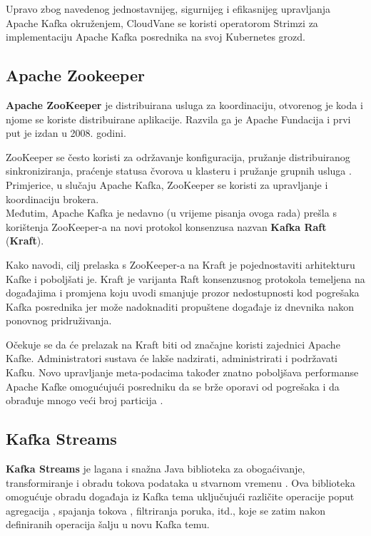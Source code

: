 \documentclass[times, utf8, diplomski]{fer}
\begin{document}
Upravo zbog navedenog jednostavnijeg, sigurnijeg i efikasnijeg upravljanja Apache Kafka okruženjem, CloudVane se koristi operatorom Strimzi za implementaciju Apache Kafka posrednika na svoj Kubernetes grozd.

\subsection{Apache Zookeeper}

\textbf{Apache ZooKeeper} je distribuirana usluga za koordinaciju, otvorenog je koda i njome se koriste distribuirane aplikacije. Razvila ga je Apache Fundacija i prvi put je izdan u 2008. godini.

ZooKeeper se često koristi za održavanje konfiguracija, pružanje distribuiranog sinkroniziranja, praćenje statusa čvorova u klasteru i pružanje grupnih usluga \citep{hunt_zookeeper_2010}. Primjerice, u slučaju Apache Kafka, ZooKeeper se koristi za upravljanje i koordinaciju brokera.\\

Međutim, Apache Kafka je nedavno (u vrijeme pisanja ovoga rada) prešla s korištenja ZooKeeper-a na novi protokol konsenzusa nazvan \textbf{Kafka Raft} (\textbf{Kraft}).

Kako \citet{chandrakant_kafkas_2022} navodi, cilj prelaska s ZooKeeper-a na Kraft je pojednostaviti arhitekturu Kafke i poboljšati je. Kraft je varijanta Raft konsenzusnog protokola temeljena na događajima i promjena koju uvodi smanjuje prozor nedostupnosti kod pogrešaka Kafka posrednika jer može nadoknaditi propuštene događaje iz dnevnika nakon ponovnog pridruživanja. 

Očekuje se da će prelazak na Kraft biti od značajne koristi zajednici Apache Kafke. Administratori sustava će lakše nadzirati, administrirati i podržavati Kafku. Novo upravljanje meta-podacima također znatno poboljšava performanse Apache Kafke omogućujući posredniku da se brže oporavi od pogrešaka i da obrađuje mnogo veći broj particija \citep{chandrakant_kafkas_2022}.

\clearpage
\subsection{Kafka Streams}
\label{sec:kstream}

\textbf{Kafka Streams} je lagana i snažna Java biblioteka za obogaćivanje, transformiranje i obradu tokova podataka u stvarnom vremenu \citep{seymour_mastering_2021}. Ova biblioteka omogućuje obradu događaja iz Kafka tema uključujući različite operacije poput agregacija , spajanja tokova , filtriranja poruka, itd., koje se zatim nakon definiranih operacija šalju u novu Kafka temu.\\
\end{document}
